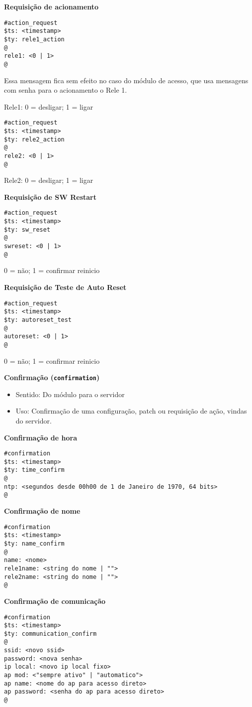 \textbf{Requisição de acionamento}
\begin{lstlisting}
#action_request
$ts: <timestamp>
$ty: rele1_action
@
rele1: <0 | 1>
@
\end{lstlisting}
Essa mensagem fica sem efeito no caso do módulo de acesso, que usa mensagens com senha para o acionamento o Rele 1.

Rele1: 0 = desligar; 1 = ligar

\begin{lstlisting}
#action_request
$ts: <timestamp>
$ty: rele2_action
@
rele2: <0 | 1>
@
\end{lstlisting}
Rele2: 0 = desligar; 1 = ligar

\textbf{Requisição de SW Restart}
\begin{lstlisting}
#action_request
$ts: <timestamp>
$ty: sw_reset
@
swreset: <0 | 1>
@
\end{lstlisting}
0 = não; 1 = confirmar reinicio

\textbf{Requisição de Teste de Auto Reset}
\begin{lstlisting}
#action_request
$ts: <timestamp>
$ty: autoreset_test
@
autoreset: <0 | 1>
@
\end{lstlisting}
0 = não; 1 = confirmar reinicio

\textbf{Confirmação (\texttt{confirmation})}
\begin{itemize}
\item Sentido: Do módulo para o servidor
\item Uso: Confirmação de uma configuração, patch ou requisição de ação, vindas do servidor.
\end{itemize}

\textbf{Confirmação de hora}
\begin{lstlisting}
#confirmation
$ts: <timestamp>
$ty: time_confirm
@
ntp: <segundos desde 00h00 de 1 de Janeiro de 1970, 64 bits>
@
\end{lstlisting}

\textbf{Confirmação de nome}
\begin{lstlisting}
#confirmation
$ts: <timestamp>
$ty: name_confirm
@
name: <nome>
rele1name: <string do nome | "">
rele2name: <string do nome | "">
@
\end{lstlisting}

\textbf{Confirmação de comunicação}
\begin{lstlisting}
#confirmation
$ts: <timestamp>
$ty: communication_confirm
@
ssid: <novo ssid>
password: <nova senha>
ip local: <novo ip local fixo>
ap mod: <"sempre ativo" | "automatico">
ap name: <nome do ap para acesso direto>
ap password: <senha do ap para acesso direto>
@
\end{lstlisting}

